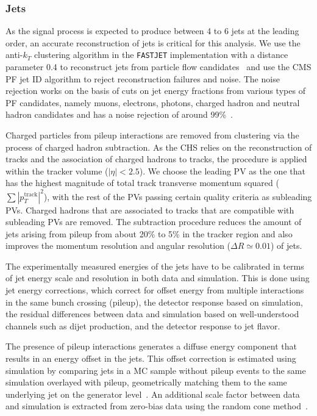 \subsubsection{Jets}
\label{sec:object_id_jets}
As the signal process is expected to produce between 4 to 6 jets at the leading order, an accurate reconstruction of jets is critical for this analysis. We use the anti-$k_T$ clustering algorithm\cite{Cacciari:2008gp} in the \texttt{FASTJET} implementation\cite{Cacciari:2011ma} with a distance parameter 0.4 to reconstruct jets from particle flow candidates~\cite{CMS:2010xta,CMS:2009nxa,CMS:2010byl} and use the CMS PF jet ID algorithm to reject reconstruction failures and noise. The noise rejection works on the basis of cuts on jet energy fractions from various types of PF candidates, namely muons, electrons, photons, charged hadron and neutral hadron candidates and has a noise rejection of around 99\%~\cite{CMS:2017wyc}.

Charged particles from pileup interactions are removed from clustering via the process of charged hadron subtraction. As the CHS relies on the reconstruction of tracks and the association of charged hadrons to tracks, the procedure is applied within the tracker volume ($|\eta| < 2.5$). We choose the leading PV as the one that has the highest magnitude of total track transverse momentum squared ($\sum |p_T^{\mathrm{track}}|^2$), with the rest of the PVs passing certain quality criteria as subleading PVs. Charged hadrons that are associated to tracks that are compatible with subleading PVs are removed. The subtraction procedure reduces the amount of jets arising from pileup from about 20\% to 5\% in the tracker region and also improves the momentum resolution and angular resolution ($\Delta R \simeq 0.01$) of jets\cite{CMS:2014ata}.

The experimentally measured energies of the jets have to be calibrated in terms of jet energy scale and resolution in both data and simulation. This is done using jet energy corrections, which correct for offset energy from multiple interactions in the same bunch crossing (pileup), the detector response based on simulation, the residual differences between data and simulation based on well-understood channels such as dijet production, and the detector response to jet flavor. 

The presence of pileup interactions generates a diffuse energy component that results in an energy offset in the jets. This offset correction is estimated using simulation by comparing jets in a MC sample without pileup events to the same simulation overlayed with pileup, geometrically matching them to the same underlying jet on the generator level~\cite{cms_jec_2017}. An additional scale factor between data and simulation is extracted from zero-bias data using the random cone method~\cite{Chatrchyan:2011ds}.  

